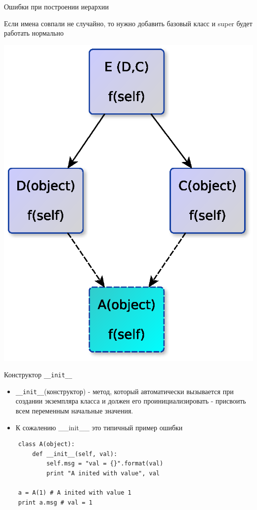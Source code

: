 \documentclass{article}
\begin{document}
\begin{center}Ошибки при построении иерархии\end{center}
Если имена совпали не случайно, то нужно добавить базовый класс и super будет работать нормально\\
\begin{center} \includegraphics[scale=0.9]{images/missed_base_class_2.eps} \end{center}
\newpage

\begin{center} Конструктор \lstinline!__init__! \end{center}
\begin{itemize}
    \item \lstinline!__init__!(конструктор) - метод, который автоматически вызывается 
        при создании экземпляра класса и должен его проинициализировать - 
        присвоить всем переменным начальные значения.
    \item К сожалению \_\_init\_\_ это типичный пример ошибки
\end{itemize}
\vspace{15pt}
\begin{lstlisting}
    class A(object):
        def __init__(self, val):
            self.msg = "val = {}".format(val)
            print "A inited with value", val

    a = A(1) # A inited with value 1
    print a.msg # val = 1
\end{lstlisting}
\newpage
\end{document}
